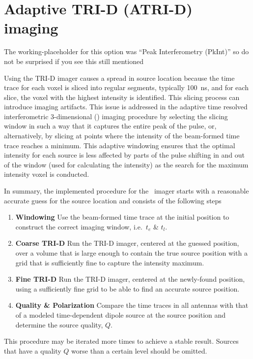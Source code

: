\section{Adaptive TRI-D (ATRI-D) imaging}

The working-placeholder for this option was ``Peak Interferometry (PkInt)'' so do not be surprised if you see this still mentioned

Using the TRI-D imager causes a spread in source location because the time trace for each voxel is sliced into regular segments, typically 100~ns, and for each slice, the voxel with the highest intensity is identified. This slicing process can introduce imaging artifacts.
This issue is addressed in the adaptive time resolved interferometric 3-dimensional (\ATRID) imaging procedure by selecting the slicing window in such a way that it captures the entire peak of the pulse, or, alternatively, by slicing at points where the intensity of the beam-formed time trace reaches a minimum. This adaptive windowing ensures that the optimal intensity for each source is less affected by parts of the pulse shifting in and out of the window (used for calculating the intensity) as the search for the maximum intensity voxel is conducted.

In summary, the implemented procedure for the \ATRID\ imager starts with a reasonable accurate guess for the source location and consists of the following steps
\begin{enumerate}
\item {\bf Windowing} Use the beam-formed time trace at the initial position to construct the correct imaging window, i.e.\ $t_e$ \& $t_l$. \item {\bf Coarse TRI-D} Run the TRI-D imager, centered at the guessed position, over a volume that is large enough to contain the true source position with a grid that is sufficiently fine to capture the intensity maximum.
\item {\bf Fine TRI-D} Run the TRI-D imager, centered at the newly-found position, using a sufficiently fine grid to be able to find an accurate source position.
\item {\bf Quality \& Polarization} Compare the time traces in all antennas with that of a modeled time-dependent dipole source at the source position and determine the source quality, $Q$.
\end{enumerate}
This procedure may be iterated more times to achieve a stable result. Sources that have a quality $Q$ worse than a certain level should be omitted.

